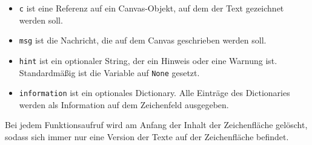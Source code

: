 \documentclass[11pt]{article}
\providecommand{\tightlist}{%
      \setlength{\itemsep}{0pt}\setlength{\parskip}{0pt}}
\begin{document}
{\begin{itemize}
\tightlist
\item
  \texttt{c} ist eine Referenz auf ein Canvas-Objekt, auf dem der Text
  gezeichnet werden soll.
\item
  \texttt{msg} ist die Nachricht, die auf dem Canvas geschrieben werden
  soll.
\item
  \texttt{hint} ist ein optionaler String, der ein Hinweis oder eine
  Warnung ist. Standardmäßig ist die Variable auf \texttt{None} gesetzt.
\item
  \texttt{information} ist ein optionales Dictionary. Alle Einträge des
  Dictionaries werden als Information auf dem Zeichenfeld ausgegeben.
\end{itemize}

Bei jedem Funktionsaufruf wird am Anfang der Inhalt der Zeichenfläche
gelöscht, sodass sich immer nur eine Version der Texte auf der
Zeichenfläche befindet.

}
\end{document}
